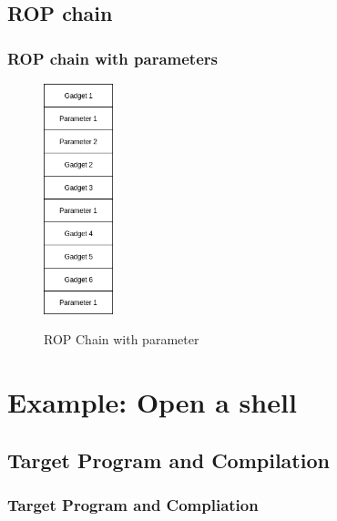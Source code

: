 \documentclass[11pt]{beamer}
\begin{document}
\subsection{ROP chain}
\begin{frame}
    \frametitle{ROP chain with parameters}
    \begin{figure}[h]
        \caption{ROP Chain with parameter}
        \centering
        \includegraphics[width=0.18\textwidth]{./img/gadgetstack.png}\label{gadget2}
    \end{figure}
\end{frame}

\section{Example: Open a shell}
\subsection{Target Program and Compilation}
\begin{frame}[fragile]
    \frametitle{Target Program and Compliation}
\end{frame}
\end{document}
